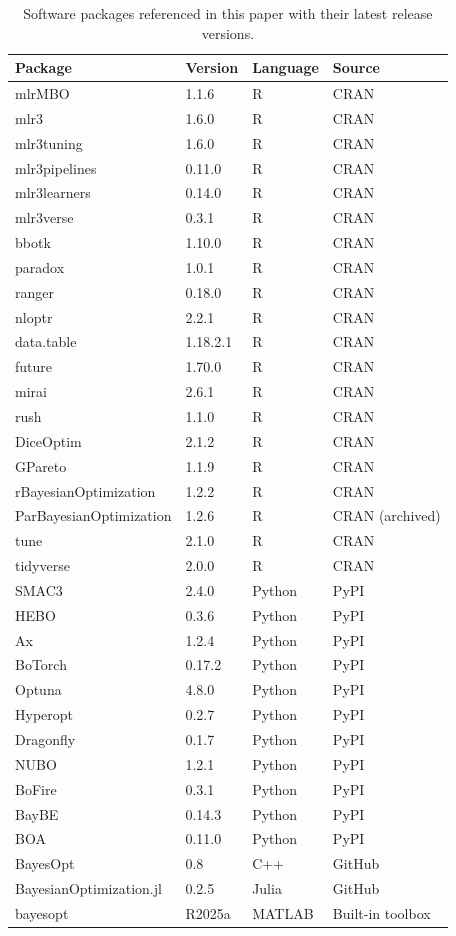 \begin{table}[H]
  \centering
  \caption{Software packages referenced in this paper with their latest release versions.}
  \label{tab:software-versions}
  \begin{tabular}{llll}
    \toprule
    Package & Version & Language & Source \\
    \midrule
    mlrMBO & 1.1.6 & R & CRAN \\
    mlr3 & 1.6.0 & R & CRAN \\
    mlr3tuning & 1.6.0 & R & CRAN \\
    mlr3pipelines & 0.11.0 & R & CRAN \\
    mlr3learners & 0.14.0 & R & CRAN \\
    mlr3verse & 0.3.1 & R & CRAN \\
    bbotk & 1.10.0 & R & CRAN \\
    paradox & 1.0.1 & R & CRAN \\
    ranger & 0.18.0 & R & CRAN \\
    nloptr & 2.2.1 & R & CRAN \\
    data.table & 1.18.2.1 & R & CRAN \\
    future & 1.70.0 & R & CRAN \\
    mirai & 2.6.1 & R & CRAN \\
    rush & 1.1.0 & R & CRAN \\
    DiceOptim & 2.1.2 & R & CRAN \\
    GPareto & 1.1.9 & R & CRAN \\
    rBayesianOptimization & 1.2.2 & R & CRAN \\
    ParBayesianOptimization & 1.2.6 & R & CRAN (archived) \\
    tune & 2.1.0 & R & CRAN \\
    tidyverse & 2.0.0 & R & CRAN \\
    SMAC3 & 2.4.0 & Python & PyPI \\
    HEBO & 0.3.6 & Python & PyPI \\
    Ax & 1.2.4 & Python & PyPI \\
    BoTorch & 0.17.2 & Python & PyPI \\
    Optuna & 4.8.0 & Python & PyPI \\
    Hyperopt & 0.2.7 & Python & PyPI \\
    Dragonfly & 0.1.7 & Python & PyPI \\
    NUBO & 1.2.1 & Python & PyPI \\
    BoFire & 0.3.1 & Python & PyPI \\
    BayBE & 0.14.3 & Python & PyPI \\
    BOA & 0.11.0 & Python & PyPI \\
    BayesOpt & 0.8 & C++ & GitHub \\
    BayesianOptimization.jl & 0.2.5 & Julia & GitHub \\
    bayesopt & R2025a & MATLAB & Built-in toolbox \\
    \bottomrule
  \end{tabular}
\end{table}
